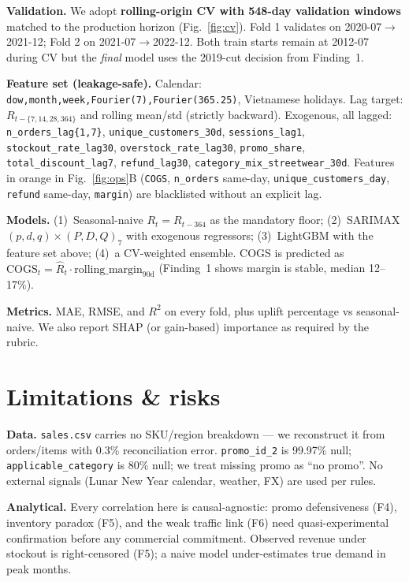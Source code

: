 \documentclass[10pt,a4paper,twocolumn]{article}
\newcommand{\keyfact}[1]{\textcolor{accent}{\textbf{#1}}}
\begin{document}
\textbf{Validation.} We adopt \keyfact{rolling-origin CV with 548-day validation windows} matched to the production horizon (Fig.~\ref{fig:cv}). Fold 1 validates on 2020-07$\to$2021-12; Fold 2 on 2021-07$\to$2022-12. Both train starts remain at 2012-07 during CV but the \emph{final} model uses the 2019-cut decision from Finding~1.

\textbf{Feature set (leakage-safe).} Calendar: \texttt{dow,month,week,Fourier(7),Fourier(365.25)}, Vietnamese holidays. Lag target: $R_{t-\{7,14,28,364\}}$ and rolling mean/std (strictly backward). Exogenous, all lagged: \texttt{n\_orders\_lag\{1,7\}}, \texttt{unique\_customers\_30d}, \texttt{sessions\_lag1}, \texttt{stockout\_rate\_lag30}, \texttt{overstock\_rate\_lag30}, \texttt{promo\_share}, \texttt{total\_discount\_lag7}, \texttt{refund\_lag30}, \texttt{category\_mix\_streetwear\_30d}. Features in orange in Fig.~\ref{fig:ops}B (\texttt{COGS}, \texttt{n\_orders} same-day, \texttt{unique\_customers\_day}, \texttt{refund} same-day, \texttt{margin}) are blacklisted without an explicit lag.

\textbf{Models.} (1)~Seasonal-naive $R_t{=}R_{t-364}$ as the mandatory floor; (2)~SARIMAX$(p,d,q){\times}(P,D,Q)_7$ with exogenous regressors; (3)~LightGBM with the feature set above; (4)~a CV-weighted ensemble. COGS is predicted as $\text{COGS}_t{=}\hat R_t \cdot \text{rolling\_margin}_{90\text{d}}$ (Finding~1 shows margin is stable, median 12--17\%).

\textbf{Metrics.} MAE, RMSE, and $R^2$ on every fold, plus uplift percentage vs seasonal-naive. We also report SHAP (or gain-based) importance as required by the rubric.

\section{Limitations \& risks}

\textbf{Data.} \texttt{sales.csv} carries no SKU/region breakdown --- we reconstruct it from orders/items with 0.3\% reconciliation error. \texttt{promo\_id\_2} is 99.97\% null; \texttt{applicable\_category} is 80\% null; we treat missing promo as ``no promo''. No external signals (Lunar New Year calendar, weather, FX) are used per rules.

\textbf{Analytical.} Every correlation here is causal-agnostic: promo defensiveness (F4), inventory paradox (F5), and the weak traffic link (F6) need quasi-experimental confirmation before any commercial commitment. Observed revenue under stockout is right-censored (F5); a naive model under-estimates true demand in peak months.
\end{document}
